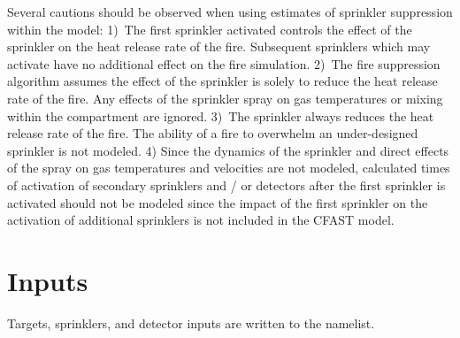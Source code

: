 {{{Several cautions should be observed when using estimates of sprinkler suppression within the model: 1)~The first sprinkler activated controls the effect of the sprinkler on the heat release rate of the fire.  Subsequent sprinklers which may activate have no additional effect on the fire simulation. 2)~The fire suppression algorithm assumes the effect of the sprinkler is solely to reduce the heat release rate of the fire. Any effects of the sprinkler spray on gas temperatures or mixing within the compartment are ignored. 3)~The sprinkler always reduces the heat release rate of the fire. The ability of a fire to overwhelm an under-designed sprinkler is not modeled. 4) Since the dynamics of the sprinkler and direct effects of the spray on gas temperatures and velocities are not modeled, calculated times of activation of secondary sprinklers and / or detectors after the first sprinkler is activated should not be modeled since the impact of the first sprinkler on the activation of additional sprinklers is not included in the CFAST model.}

\section{ Inputs}

Targets, sprinklers, and detector inputs are written to the  namelist.

}}
